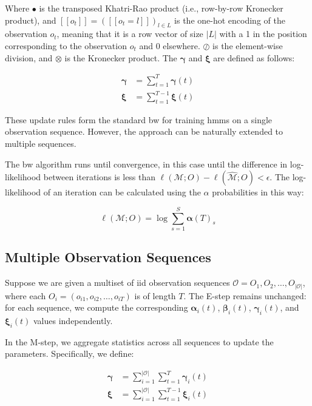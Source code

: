 Where $\smblkcircle$ is the transposed Khatri-Rao product (i.e., row-by-row Kronecker product), and $[[o_t]] = ([[o_t=l]])_{l \in L}$ is the one-hot encoding of the observation $o_t$, meaning that it is a row vector of size $|L|$ with a 1 in the position corresponding to the observation $o_t$ and 0 elsewhere.
$\oslash$ is the element-wise division, and $\otimes$ is the Kronecker product.
The $\pmb{\gamma}$ and $\pmb{\xi}$ are defined as follows:


\begin{align}
    \pmb{\gamma} & = \sum_{t=1}^{T} \pmb{\gamma}(t) \\
    \pmb{\xi}    & = \sum_{t=1}^{T-1} \pmb{\xi}(t)
    \label{eq:gamma-xi-definitions}
\end{align}


These update rules form the standard \gls{bw} for training \glspl{hmm} on a single observation sequence.
However, the approach can be naturally extended to multiple sequences.

The \gls{bw} algorithm runs until convergence, in this case until the difference in log-likelihood between iterations is less than $\ell(\mathcal{M};O) - \ell(\hat{\mathcal{M}};O) < \epsilon$.
The log-likelihood of an iteration can be calculated using the $\alpha$ probabilities in this way:

\begin{equation}
    \ell(\mathcal{M};O) = \log \sum_{s=1}^{S} \pmb{\alpha}(T)_s
\end{equation}


\subsection{Multiple Observation Sequences}\label{subsec:multiple-observation-sequences}
Suppose we are given a multiset of \gls{iid} observation sequences $\mathcal{O} = {O_1, O_2, \ldots, O_{|\mathcal{O}|}}$, where each $O_i = (o_{i1}, o_{i2}, \ldots, o_{iT})$ is of length $T$.
The E-step remains unchanged: for each sequence, we compute the corresponding $\pmb{\alpha}_i(t)$, $\pmb{\beta}_i(t)$, $\pmb{\gamma}_i(t)$, and $\pmb{\xi}_i(t)$ values independently.

In the M-step, we aggregate statistics across all sequences to update the parameters.
Specifically, we define:

\begin{align}
    \pmb{\gamma} & = \sum_{i=1}^{|\mathcal{O}|}\sum_{t=1}^{T} \pmb{\gamma}_{i}(t) \\
    \pmb{\xi}    & = \sum_{i=1}^{|\mathcal{O}|}\sum_{t=1}^{T-1} \pmb{\xi}_{i}(t)
\end{align}


